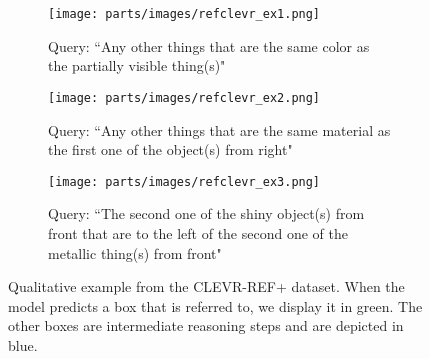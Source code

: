 \begin{figure*}[t!]
    \centering
    \begin{subfigure}[t]{0.31\textwidth}
        \centering
        \texttt{[image: parts/images/refclevr\_ex1.png]}
        \caption{Query: ``Any other things that are the same color as the partially visible thing(s)"}
    \end{subfigure}\begin{subfigure}[t]{0.31\textwidth}
        \centering
        \texttt{[image: parts/images/refclevr\_ex2.png]}
        \caption{Query: ``Any other things that are the same material as the first one of the object(s) from right"}
    \end{subfigure} 
    \begin{subfigure}[t]{0.31\textwidth}
        \centering
        \texttt{[image: parts/images/refclevr\_ex3.png]}
        \caption{Query: ``The second one of the shiny object(s) from front that are to the left of the second one of the metallic thing(s) from front"}
    \end{subfigure}
    \caption{Qualitative example from the CLEVR-REF+ dataset. When the model predicts a box that is referred to, we display it in green. The other boxes are intermediate reasoning steps and are depicted in blue.
    \label{fig:phrasecut_examples}}
\end{figure*}



